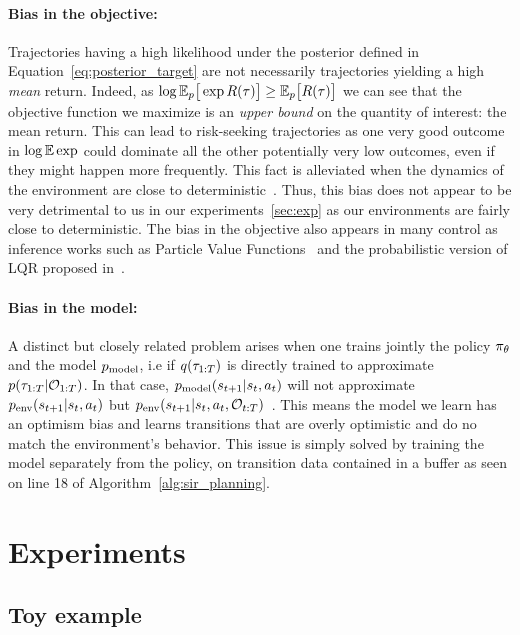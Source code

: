 \paragraph*{Bias in the objective:} Trajectories having a high likelihood under the posterior defined in Equation~\ref{eq:posterior_target} are not necessarily trajectories yielding a high \textit{mean} return. Indeed, as 
$\log \mathbb{E}_p  \big[\exp R(\tau) \big] \ge  \mathbb{E}_p  \big[ R(\tau) \big]$
we can see that the objective function we maximize is an \textit{upper bound} on the quantity of interest: the mean return.
This can lead to risk-seeking trajectories as one very good outcome in $\log \mathbb{E} \exp$ could dominate all the other potentially very low outcomes, even if they might happen more frequently. This fact is alleviated when the dynamics of the environment are close to deterministic~\citep{levine2018reinforcement}. Thus, this bias does not appear to be very detrimental to us in our experiments~\ref{sec:exp} as our environments are fairly close to deterministic. The bias in the objective also appears in many control as inference works such as Particle Value Functions~\citep{maddison2017particle} and the probabilistic version of LQR proposed in~\cite{toussaint2009robot}.

\paragraph*{Bias in the model:} A distinct but closely related problem arises when one trains jointly the policy $\pi_\theta$ and the model $p_{\rm{model}}$, i.e if $q(\tau_{1:T})$ is directly trained to approximate $p(\tau_{1:T} | {\mathcal{O}}_{1:T})$. In that case, $p_{\rm{model}}(s_{t+1} | s_t, a_t)$ will not approximate $p_{\text{env}}(s_{t+1} | s_t, a_t)$ but $p_{\text{env}}(s_{t+1} | s_t, a_t, {\mathcal{O}}_{t:T})$~\citep{levine2018reinforcement}. This means the model we learn has an optimism bias and learns transitions that are overly optimistic and do no match the environment's behavior.
This issue is simply solved by training the model separately from the policy, on transition data contained in a buffer as seen on line 18 of Algorithm~\ref{alg:sir_planning}.


\section{Experiments}
\subsection{Toy example}

